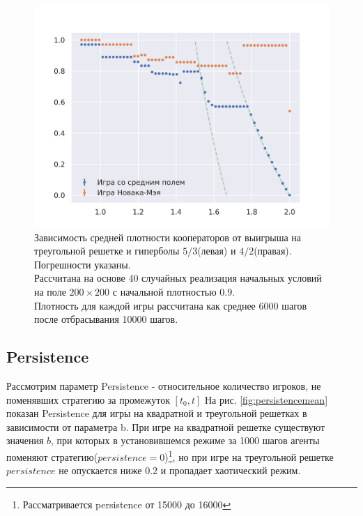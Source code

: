 \documentclass[12pt]{article}
\begin{document}
    \begin{figure}[!h]
        \centering
        \captionsetup{justification=centering}
        \includegraphics[scale=0.8]{TriangularMeanFieldGame/density_NovakMay_Mean_triangular_game.png}
        \caption{Зависимость средней плотности кооператоров от выигрыша на треугольной решетке и гиперболы $5/3$(левая) и $4/2$(правая). Погрешности указаны.\\
        Рассчитана на основе 40 случайных реализация начальных условий на поле $200\times200$ с начальной плотностью $0.9$.\\
        Плотность для каждой игры рассчитана как среднее 6000 шагов после отбрасывания 10000 шагов. 
        }
        \label{fig:payoffvsdensityTr}
    \end{figure}
    
    
\subsection{Persistence}
    Рассмотрим параметр Persistence - относительное количество игроков, не поменявших стратегию за промежуток $[t_0, t]$
    На рис. \ref{fig:persistencemean} показан Persistence для игры на квадратной и треугольной решетках в зависимости от параметра b. При игре на квадратной решетке существуют значения $b$, при которых в установившемся режиме за 1000 шагов агенты поменяют стратегию($persistence=0$)\footnote{Рассматривается persistence от 15000 до 16000}, но при игре на треугольной решетке $persistence$ не опускается ниже $0.2$ и пропадает хаотический режим.
    
\end{document}
